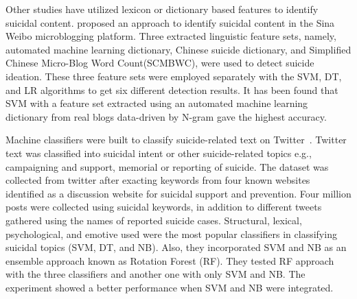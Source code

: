 \documentclass[11pt]{article}
\begin{document}
Other studies have utilized lexicon or dictionary based features to identify suicidal content.
\citet{26new10.1007/978-3-030-37429-7_17} proposed an approach to identify suicidal content in the Sina Weibo microblogging platform. Three extracted linguistic feature sets, namely, automated machine learning dictionary, Chinese suicide dictionary, and Simplified Chinese Micro-Blog Word Count(SCMBWC), were used to detect suicide ideation. These three feature sets were employed separately with the SVM, DT, and LR algorithms to get six different detection results. %
It has been found that SVM with a feature set extracted using an automated machine learning dictionary from real blogs data-driven by N-gram gave the highest accuracy. 

Machine classifiers were built to classify suicide-related text on Twitter~\cite{32n10.1145/2700171.2791023}. Twitter text was classified into suicidal intent or other suicide-related topics e.g., campaigning and support, memorial or reporting of suicide. The dataset was collected from twitter after exacting keywords from four known websites identified as a discussion website for suicidal support and prevention. Four million posts were collected using suicidal keywords, in addition to different tweets gathered using the names of reported suicide cases. Structural, lexical, psychological, and emotive used were the most popular classifiers in classifying suicidal topics (SVM, DT, and NB). Also, they incorporated SVM and NB as an ensemble approach known as Rotation Forest (RF). They tested RF approach with the three classifiers and another one with only SVM and NB. The experiment showed a better performance when SVM and NB were integrated.
\end{document}
